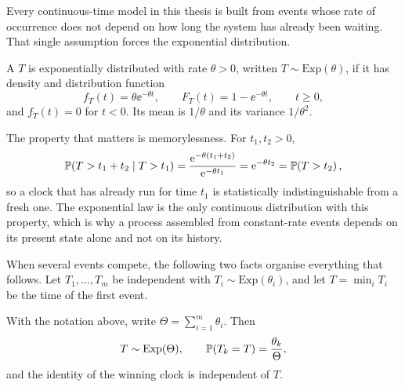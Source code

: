Every continuous-time model in this thesis is built from events whose rate of occurrence
does not depend on how long the system has already been waiting. That single assumption
forces the exponential distribution.

\begin{definition}
\label{m:def:exp}
A \rv{} $T$ is exponentially distributed with rate $\theta>0$, written
$T\sim\mathrm{Exp}(\theta)$, if it has density and distribution function
\begin{equation*}
f_T(t) = \theta\ee^{-\theta t},
\qquad
F_T(t) = 1-\ee^{-\theta t},
\qquad t\ge0,
\end{equation*}
and $f_T(t)=0$ for $t<0$. Its mean is $1/\theta$ and its variance $1/\theta^2$.
\end{definition}

The property that matters is memorylessness. For $t_1,t_2>0$,
\begin{equation}
\label{m:eq:memoryless}
\mathbb{P}\!\left(T > t_1+t_2 \mid T > t_1\right)
= \frac{\mathrm{e}^{-\theta(t_1+t_2)}}{\mathrm{e}^{-\theta t_1}}
= \mathrm{e}^{-\theta t_2}
= \mathbb{P}\!\left(T > t_2\right),
\end{equation}
so a clock that has already run for time $t_1$ is statistically indistinguishable
from a fresh one. The exponential law is the only continuous distribution with this
property, which is why a process assembled from constant-rate events depends on its
present state alone and not on its history.

When several events compete, the following two facts organise everything that
follows. Let $T_1,\dots,T_m$ be independent with $T_i\sim\mathrm{Exp}(\theta_i)$,
and let $T = \min_i T_i$ be the time of the first event.

\begin{proposition}
\label{m:prop:race}
With the notation above, write $\Theta = \sum_{i=1}^m\theta_i$. Then
\begin{equation}
\label{m:eq:race}
T \sim \mathrm{Exp}(\Theta),
\qquad
\mathbb{P}\!\left(T_k = T\right) = \frac{\theta_k}{\Theta},
\end{equation}
and the identity of the winning clock is independent of $T$.
\end{proposition}

